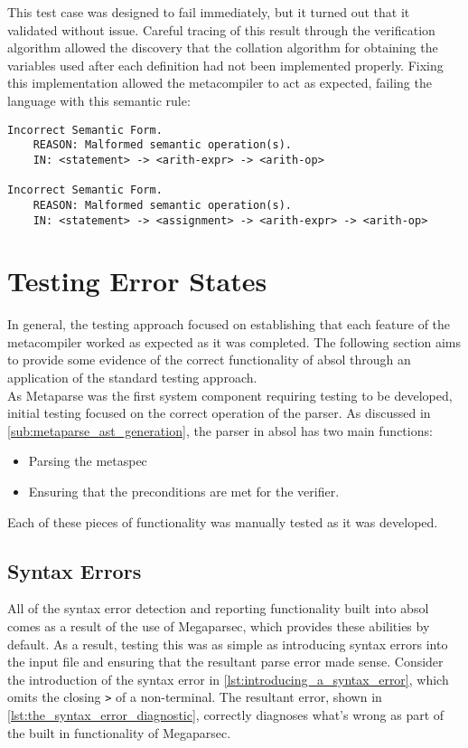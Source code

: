This test case was designed to fail immediately, but it turned out that it validated without issue. 
Careful tracing of this result through the verification algorithm allowed the discovery that the collation algorithm for obtaining the variables used after each definition had not been implemented properly. 
Fixing this implementation allowed the metacompiler to act as expected, failing the language with this semantic rule:

\begin{verbatim}
Incorrect Semantic Form.
    REASON: Malformed semantic operation(s).
    IN: <statement> -> <arith-expr> -> <arith-op>

Incorrect Semantic Form.
    REASON: Malformed semantic operation(s).
    IN: <statement> -> <assignment> -> <arith-expr> -> <arith-op>
\end{verbatim}



\section{Testing Error States} %
\label{sec:testing_error_states}
In general, the testing approach focused on establishing that each feature of the metacompiler worked as expected as it was completed. 
The following section aims to provide some evidence of the correct functionality of \gls{absol} through an application of the standard testing approach. \\

As Metaparse was the first system component requiring testing to be developed, initial testing focused on the correct operation of the parser.
As discussed in \autoref{sub:metaparse_ast_generation}, the parser in \gls{absol} has two main functions:
\begin{itemize}
    \item Parsing the \gls{metaspec}
    \item Ensuring that the preconditions are met for the verifier.
\end{itemize}

Each of these pieces of functionality was manually tested as it was developed. 

\subsection{Syntax Errors} %
\label{sub:syntax_errors}
All of the syntax error detection and reporting functionality built into \gls{absol} comes as a result of the use of Megaparsec, which provides these abilities by default.
As a result, testing this was as simple as introducing syntax errors into the input file and ensuring that the resultant parse error made sense. 
Consider the introduction of the syntax error in \autoref{lst:introducing_a_syntax_error}, which omits the closing \texttt{>} of a non-terminal. 
The resultant error, shown in \autoref{lst:the_syntax_error_diagnostic}, correctly diagnoses what's wrong as part of the built in functionality of Megaparsec. 

